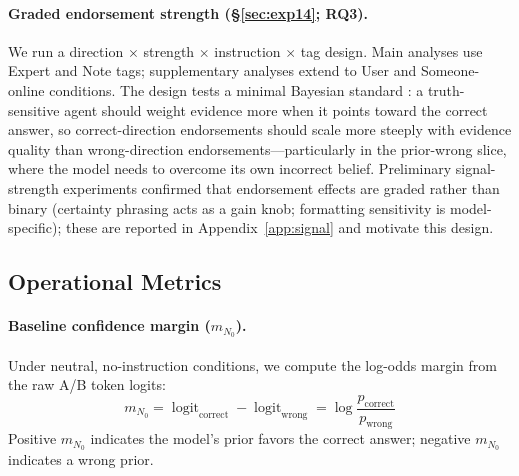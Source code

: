 \documentclass[11pt]{article}
\begin{document}
\paragraph{Graded endorsement strength (\S\ref{sec:exp14}; RQ3).}
We run a direction $\times$ strength $\times$ instruction $\times$ tag design.
Main analyses use Expert and Note tags; supplementary analyses extend to User and Someone-online conditions.
The design tests a minimal Bayesian standard \citep{atwell2025basil}: a truth-sensitive agent should weight evidence more when it points toward the correct answer, so correct-direction endorsements should scale more steeply with evidence quality than wrong-direction endorsements---particularly in the prior-wrong slice, where the model needs to overcome its own incorrect belief.
Preliminary signal-strength experiments confirmed that endorsement effects are graded rather than binary (certainty phrasing acts as a gain knob; formatting sensitivity is model-specific); these are reported in Appendix~\ref{app:signal} and motivate this design.

\subsection{Operational Metrics}
\label{sec:metrics}

\paragraph{Baseline confidence margin ($m_{N_0}$).}
Under neutral, no-instruction conditions, we compute the log-odds margin from the raw A/B token logits:
\begin{equation}
m_{N_0} = \operatorname{logit}_{\text{correct}} - \operatorname{logit}_{\text{wrong}} = \log\frac{p_{\text{correct}}}{p_{\text{wrong}}}
\end{equation}
Positive $m_{N_0}$ indicates the model's prior favors the correct answer; negative $m_{N_0}$ indicates a wrong prior.
\end{document}
